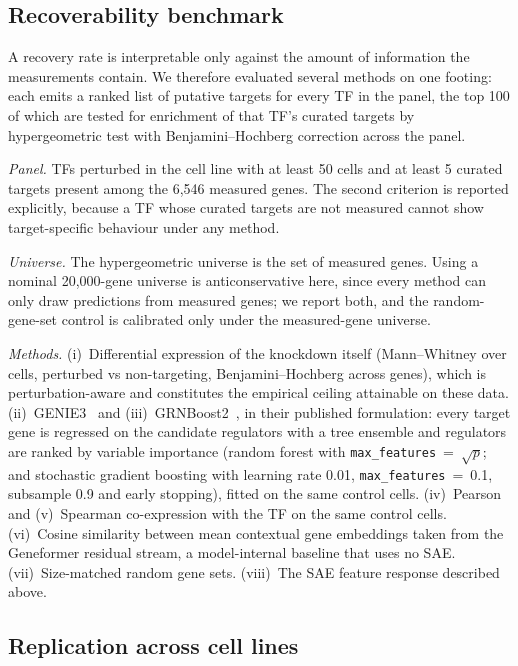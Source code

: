 \documentclass[onecolumn,11pt]{article}
\begin{document}
\subsection*{Recoverability benchmark}

A recovery rate is interpretable only against the amount of information the measurements contain.
We therefore evaluated several methods on one footing: each emits a ranked list of putative targets
for every TF in the panel, the top 100 of which are tested for enrichment of that TF's curated
targets by hypergeometric test with Benjamini--Hochberg correction across the panel.

\emph{Panel.} TFs perturbed in the cell line with at least 50 cells and at least 5 curated targets
present among the 6,546 measured genes. The second criterion is reported explicitly, because a TF
whose curated targets are not measured cannot show target-specific behaviour under any method.

\emph{Universe.} The hypergeometric universe is the set of measured genes. Using a nominal
20,000-gene universe is anticonservative here, since every method can only draw predictions from
measured genes; we report both, and the random-gene-set control is calibrated only under the
measured-gene universe.

\emph{Methods.} (i)~Differential expression of the knockdown itself (Mann--Whitney over cells,
perturbed vs non-targeting, Benjamini--Hochberg across genes), which is perturbation-aware and
constitutes the empirical ceiling attainable on these data. (ii)~GENIE3~\cite{huynhthu2010genie3}
and (iii)~GRNBoost2~\cite{moerman2019grnboost2}, in their published formulation: every target gene
is regressed on the candidate regulators with a tree ensemble and regulators are ranked by variable
importance (random forest with \texttt{max\_features}~=~$\sqrt{p}$; and stochastic gradient boosting
with learning rate 0.01, \texttt{max\_features}~=~0.1, subsample 0.9 and early stopping), fitted on
the same control cells. (iv)~Pearson and (v)~Spearman co-expression with the TF on the same control
cells. (vi)~Cosine similarity between mean contextual gene embeddings taken from the Geneformer
residual stream, a model-internal baseline that uses no SAE. (vii)~Size-matched random gene sets.
(viii)~The SAE feature response described above.

\subsection*{Replication across cell lines}
\end{document}
